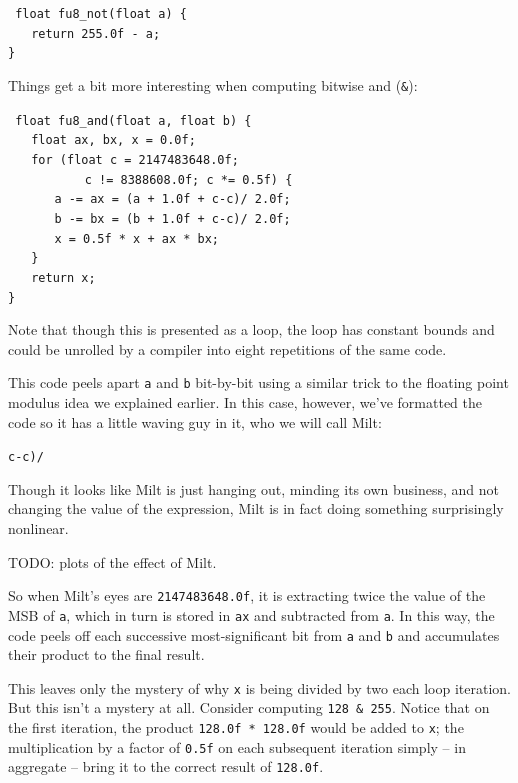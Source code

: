 \documentclass{acmsiggraph}
\theoremstyle{remark}
\theoremstyle{definition}
\begin{document}
{\tt
float fu8\_not(float a) \{ \\
$\phantom{XX}$return 255.0f - a; \\
\}
}

Things get a bit more interesting when computing bitwise and ({\tt \&}):

{\tt
float fu8\_and(float a, float b) \{ \\
$\phantom{XX}$float ax, bx, x = 0.0f; \\
$\phantom{XX}$for (float c = 2147483648.0f;\\
$\phantom{XXXXXX}$ c != 8388608.0f; c *= 0.5f) \{ \\
$\phantom{XXXX}$a -= ax = (a + 1.0f + c-c)/ 2.0f; \\
$\phantom{XXXX}$b -= bx = (b + 1.0f + c-c)/ 2.0f; \\
$\phantom{XXXX}$x = 0.5f * x + ax * bx; \\
$\phantom{XX}$\} \\
$\phantom{XX}$return x; \\
\}
}

Note that though this is presented as a loop, the loop has constant bounds and could be unrolled by a compiler into eight repetitions of the same code.

This code peels apart {\tt a} and {\tt b} bit-by-bit using a similar trick to the floating point modulus idea we explained earlier.
In this case, however, we've formatted the code so it has a little waving guy in it, who we will call Milt:

\begin{center}
\huge
{\tt c-c)/}
\end{center}

Though it looks like Milt is just hanging out, minding its own business, and not changing the value of the expression,
Milt is in fact doing something surprisingly nonlinear.

TODO: plots of the effect of Milt.

So when Milt's eyes are {\tt 2147483648.0f}, it is extracting twice the value of the MSB of {\tt a},
which in turn is stored in {\tt ax} and subtracted from {\tt a}.
In this way, the code peels off each successive most-significant bit from {\tt a} and {\tt b} and accumulates their product to the final result.

This leaves only the mystery of why {\tt x} is being divided by two each loop iteration.
But this isn't a mystery at all.
Consider computing {\tt 128 \& 255}.
Notice that on the first iteration, the product {\tt 128.0f * 128.0f} would be added to {\tt x};
the multiplication by a factor of {\tt 0.5f} on each subsequent iteration simply -- in aggregate -- bring it to the correct result of {\tt 128.0f}.
\end{document}
